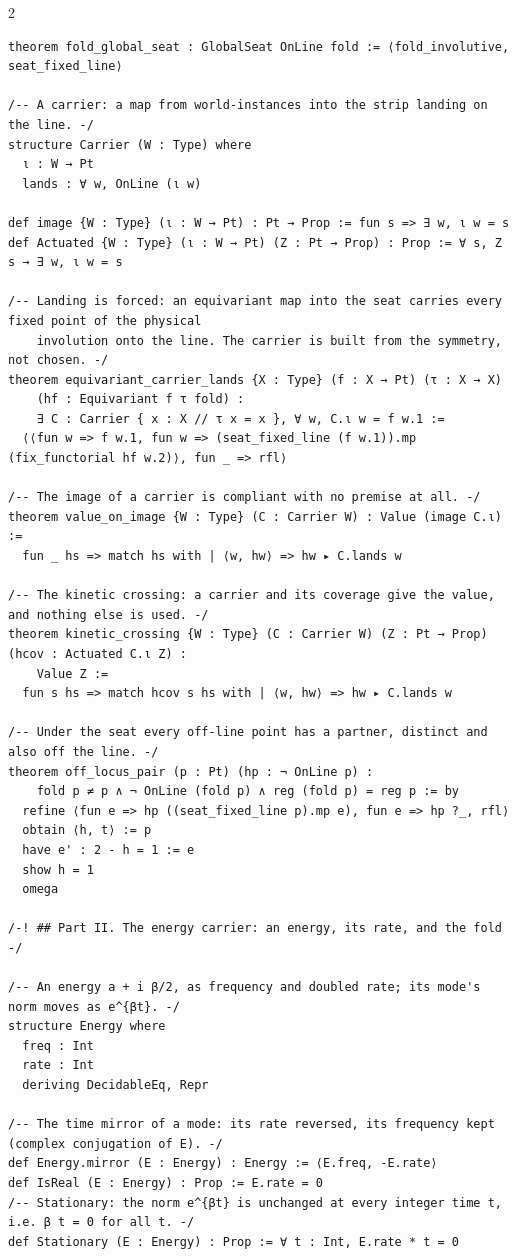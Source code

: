 \documentclass[10pt]{article}
\begin{document}
\begin{multicols}{2}
\begin{Verbatim}[fontsize=\fontsize{6.0}{6.9}\selectfont,breaklines,breakanywhere,breaksymbolleft={}]
theorem fold_global_seat : GlobalSeat OnLine fold := ⟨fold_involutive, seat_fixed_line⟩

/-- A carrier: a map from world-instances into the strip landing on the line. -/
structure Carrier (W : Type) where
  ι : W → Pt
  lands : ∀ w, OnLine (ι w)

def image {W : Type} (ι : W → Pt) : Pt → Prop := fun s => ∃ w, ι w = s
def Actuated {W : Type} (ι : W → Pt) (Z : Pt → Prop) : Prop := ∀ s, Z s → ∃ w, ι w = s

/-- Landing is forced: an equivariant map into the seat carries every fixed point of the physical
    involution onto the line. The carrier is built from the symmetry, not chosen. -/
theorem equivariant_carrier_lands {X : Type} (f : X → Pt) (τ : X → X)
    (hf : Equivariant f τ fold) :
    ∃ C : Carrier { x : X // τ x = x }, ∀ w, C.ι w = f w.1 :=
  ⟨⟨fun w => f w.1, fun w => (seat_fixed_line (f w.1)).mp (fix_functorial hf w.2)⟩, fun _ => rfl⟩

/-- The image of a carrier is compliant with no premise at all. -/
theorem value_on_image {W : Type} (C : Carrier W) : Value (image C.ι) :=
  fun _ hs => match hs with | ⟨w, hw⟩ => hw ▸ C.lands w

/-- The kinetic crossing: a carrier and its coverage give the value, and nothing else is used. -/
theorem kinetic_crossing {W : Type} (C : Carrier W) (Z : Pt → Prop) (hcov : Actuated C.ι Z) :
    Value Z :=
  fun s hs => match hcov s hs with | ⟨w, hw⟩ => hw ▸ C.lands w

/-- Under the seat every off-line point has a partner, distinct and also off the line. -/
theorem off_locus_pair (p : Pt) (hp : ¬ OnLine p) :
    fold p ≠ p ∧ ¬ OnLine (fold p) ∧ reg (fold p) = reg p := by
  refine ⟨fun e => hp ((seat_fixed_line p).mp e), fun e => hp ?_, rfl⟩
  obtain ⟨h, t⟩ := p
  have e' : 2 - h = 1 := e
  show h = 1
  omega

/-! ## Part II. The energy carrier: an energy, its rate, and the fold -/

/-- An energy a + i β/2, as frequency and doubled rate; its mode's norm moves as e^{βt}. -/
structure Energy where
  freq : Int
  rate : Int
  deriving DecidableEq, Repr

/-- The time mirror of a mode: its rate reversed, its frequency kept (complex conjugation of E). -/
def Energy.mirror (E : Energy) : Energy := ⟨E.freq, -E.rate⟩
def IsReal (E : Energy) : Prop := E.rate = 0
/-- Stationary: the norm e^{βt} is unchanged at every integer time t, i.e. β t = 0 for all t. -/
def Stationary (E : Energy) : Prop := ∀ t : Int, E.rate * t = 0


\end{Verbatim}
\end{multicols}
\end{document}
